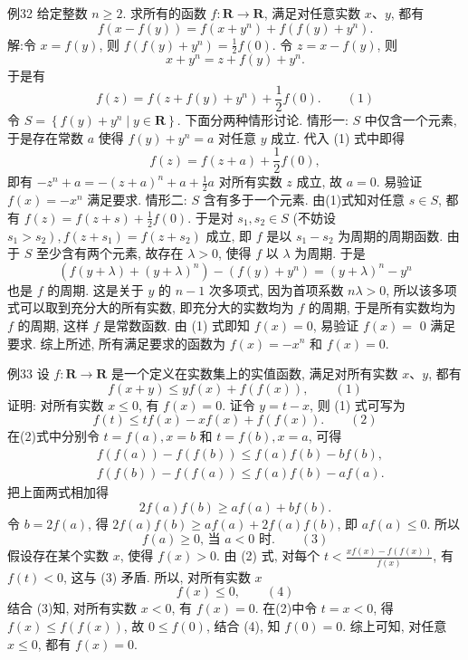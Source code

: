 例32 给定整数 $n \geqslant 2$. 求所有的函数 $f: \mathbf{R} \rightarrow \mathbf{R}$, 满足对任意实数 $x 、 y$, 都有
$$
f(x-f(y))=f\left(x+y^n\right)+f\left(f(y)+y^n\right) .
$$
解:令 $x=f(y)$, 则 $f\left(f(y)+y^n\right)=\frac{1}{2} f(0)$. 令 $z=x-f(y)$, 则
$$
x+y^n=z+f(y)+y^n .
$$
于是有
$$
f(z)=f\left(z+f(y)+y^n\right)+\frac{1}{2} f(0) . \quad\quad (1)
$$
令 $S=\left\{f(y)+y^n \mid y \in \mathbf{R}\right\}$. 下面分两种情形讨论.
情形一: $S$ 中仅含一个元素, 于是存在常数 $a$ 使得 $f(y)+y^n=a$ 对任意 $y$ 成立.
代入 (1) 式中即得
$$
f(z)=f(z+a)+\frac{1}{2} f(0),
$$
即有 $-z^n+a=-(z+a)^n+a+\frac{1}{2} a$ 对所有实数 $z$ 成立, 故 $a=0$. 易验证 $f(x)=-x^n$ 满足要求.
情形二: $S$ 含有多于一个元素.
由(1)式知对任意 $s \in S$, 都有 $f(z)=f(z+s)+\frac{1}{2} f(0)$. 于是对 $s_1, s_2 \in S$ (不妨设 $\left.s_1>s_2\right), f\left(z+s_1\right)=f\left(z+s_2\right)$ 成立, 即 $f$ 是以 $s_1-s_2$ 为周期的周期函数.
由于 $S$ 至少含有两个元素, 故存在 $\lambda>0$, 使得 $f$ 以 $\lambda$ 为周期.
于是
$$
\left(f(y+\lambda)+(y+\lambda)^n\right)-\left(f(y)+y^n\right)=(y+\lambda)^n-y^n
$$
也是 $f$ 的周期.
这是关于 $y$ 的 $n-1$ 次多项式, 因为首项系数 $n \lambda>0$, 所以该多项式可以取到充分大的所有实数, 即充分大的实数均为 $f$ 的周期, 于是所有实数均为 $f$ 的周期, 这样 $f$ 是常数函数.
由 (1) 式即知 $f(x)=0$, 易验证 $f(x)=$ 0 满足要求.
综上所述, 所有满足要求的函数为 $f(x)=-x^n$ 和 $f(x)=0$.



例33 设 $f: \mathbf{R} \rightarrow \mathbf{R}$ 是一个定义在实数集上的实值函数, 满足对所有实数 $x 、 y$, 都有
$$
f(x+y) \leqslant y f(x)+f(f(x)), \quad\quad (1)
$$
证明: 对所有实数 $x \leqslant 0$, 有 $f(x)=0$.
证令 $y=t-x$, 则 (1) 式可写为
$$
f(t) \leqslant t f(x)-x f(x)+f(f(x)) . \quad\quad (2)
$$
在(2)式中分别令 $t=f(a), x=b$ 和 $t=f(b), x=a$, 可得
$$
\begin{aligned}
& f(f(a))-f(f(b)) \leqslant f(a) f(b)-b f(b), \\
& f(f(b))-f(f(a)) \leqslant f(a) f(b)-a f(a) .
\end{aligned}
$$
把上面两式相加得
$$
2 f(a) f(b) \geqslant a f(a)+b f(b) .
$$
令 $b=2 f(a)$, 得 $2 f(a) f(b) \geqslant a f(a)+2 f(a) f(b)$, 即 $a f(a) \leqslant 0$. 所以
$$
f(a) \geqslant 0 \text {, 当 } a<0 \text { 时.
} \quad\quad (3)
$$
假设存在某个实数 $x$, 使得 $f(x)>0$. 由 (2) 式, 对每个 $t<\frac{x f(x)-f(f(x))}{f(x)}$, 有 $f(t)<0$, 这与 (3) 矛盾.
所以, 对所有实数 $x$
$$
f(x) \leqslant 0, \quad\quad (4)
$$
结合 (3)知, 对所有实数 $x<0$, 有 $f(x)=0$.
在(2)中令 $t=x<0$, 得 $f(x) \leqslant f(f(x))$, 故 $0 \leqslant f(0)$, 结合 (4), 知 $f(0)=0$.
综上可知, 对任意 $x \leqslant 0$, 都有 $f(x)=0$.




